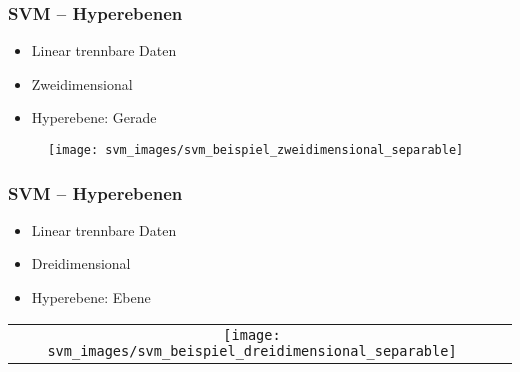 \begin{frame}

\frametitle{SVM -- Hyperebenen}

\begin{itemize}
	\setlength{\itemsep}{5pt}
	\item Linear trennbare Daten
	\item Zweidimensional
	\item Hyperebene: Gerade
\end{itemize}

\vspace{3pt}

\begin{figure}[h]
\centering
\texttt{[image: svm\_images/svm\_beispiel\_zweidimensional\_separable]}
\end{figure}

\end{frame}







\begin{frame}

\frametitle{SVM -- Hyperebenen}

\begin{itemize}
	\setlength{\itemsep}{5pt}
	\item Linear trennbare Daten
	\item Dreidimensional
	\item Hyperebene: Ebene
\end{itemize}

\vspace{3pt}

\center
\begin{tabular}[h]{cl}
\texttt{[image: svm\_images/svm\_beispiel\_dreidimensional\_separable]} &  {\tiny \cite{svmsuccinctly}}
\end{tabular}

\end{frame}







